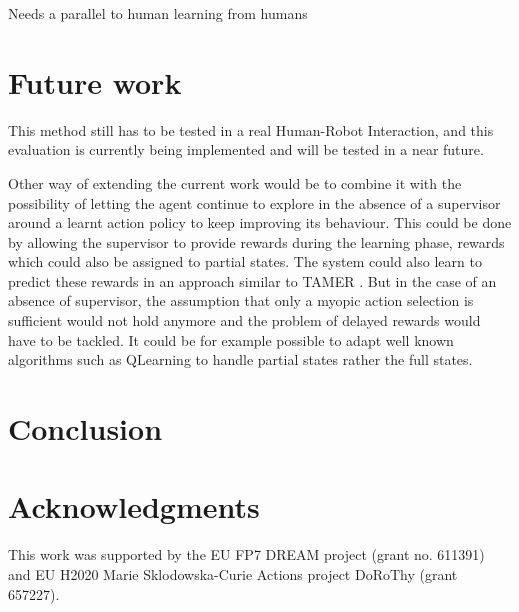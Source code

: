 \documentclass[letterpaper]{article} %
\begin{document}
Needs a parallel to human learning from humans

\section{Future work}

This method still has to be tested in a real Human-Robot Interaction, and this
evaluation is currently being implemented and will be tested in a near future.

Other way of extending the current work would be to combine it with the
possibility of letting the agent continue to explore in the absence of a
supervisor around a learnt action policy to keep improving its behaviour. This
could be done by allowing the supervisor to provide rewards during the learning
phase, rewards which could also be assigned to partial states. The system could
also learn to predict these rewards in an approach similar to TAMER 
\cite{knox2009interactively}. But in the case of an absence of supervisor, the assumption that only a
myopic action selection is sufficient would not hold anymore and the problem of
delayed rewards would have to be tackled. It could be for example possible to
adapt well known algorithms such as QLearning to handle partial states rather
the full states.

\section{Conclusion}
\label{sec:conclusion}
\section{Acknowledgments}
This work was supported by the EU FP7 DREAM project (grant no.  611391) and EU
H2020 Marie Sklodowska-Curie Actions project DoRoThy (grant 657227).  

 
\end{document}
